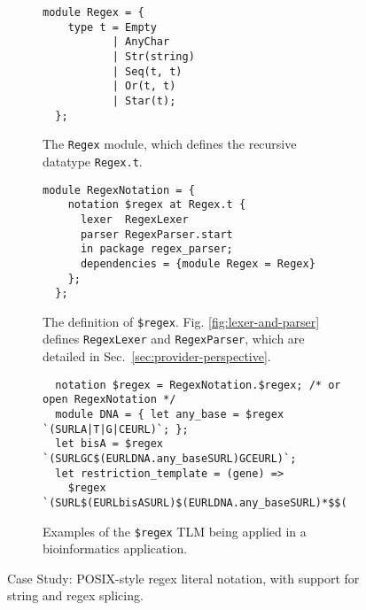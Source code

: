 \documentclass[acmsmall,screen]{acmart}
\newcommand{\li}[1]{\lstinline[basicstyle=\ttfamily\fontsize{9pt}{1em}\selectfont]{#1}}
\begin{document}
\begin{figure}[t]
\begin{subfigure}[t]{0.45\textwidth}
\vspace{-4px}
\begin{lstlisting}[mathescape=~]
  module Regex = {
    type t = Empty
           | AnyChar 
           | Str(string)
           | Seq(t, t) 
           | Or(t, t) 
           | Star(t);
  };
\end{lstlisting}
\vspace{-5px}
\caption{The \li{Regex} module, which defines the recursive datatype \li{Regex.t}.}
\label{fig:Regex-module-def}
\end{subfigure}
\hfill
\begin{subfigure}[t]{0.53\textwidth}
\vspace{-4px}
\begin{lstlisting}[mathescape=|]
  module RegexNotation = {
    notation $regex at Regex.t {
      lexer  RegexLexer
      parser RegexParser.start
      in package regex_parser;
      dependencies = {module Regex = Regex}
    };
  };
\end{lstlisting}
\vspace{-5px}
\caption{The definition of \li{$regex}. Fig. \ref{fig:lexer-and-parser} defines \li{RegexLexer} and \li{RegexParser}, which are detailed in Sec.~\ref{sec:provider-perspective}.}
\label{fig:regex-tlm-def}
\end{subfigure}

\begin{subfigure}[t]{\textwidth}
\vspace{7px}
\begin{lstlisting}
  notation $regex = RegexNotation.$regex; /* or open RegexNotation */
  module DNA = { let any_base = $regex `(SURLA|T|G|CEURL)`; };
  let bisA = $regex `(SURLGC$(EURLDNA.any_baseSURL)GCEURL)`;
  let restriction_template = (gene) => 
    $regex `(SURL$(EURLbisASURL)$(EURLDNA.any_baseSURL)*$$(EURLgeneSURL)$(EURLDNA.any_baseSURL)*$(EURLbisASURL)EURL)`;
\end{lstlisting}
\vspace{-4px}
\caption{Examples of the \li{$regex} TLM being applied in a bioinformatics application. %
}
\label{fig:first-tlm-example}
\end{subfigure}
\vspace{1px}
\caption{Case Study: POSIX-style regex literal notation, with support for string and regex splicing.}
\label{fig:regex-case-study}
\end{figure}
\end{document}
